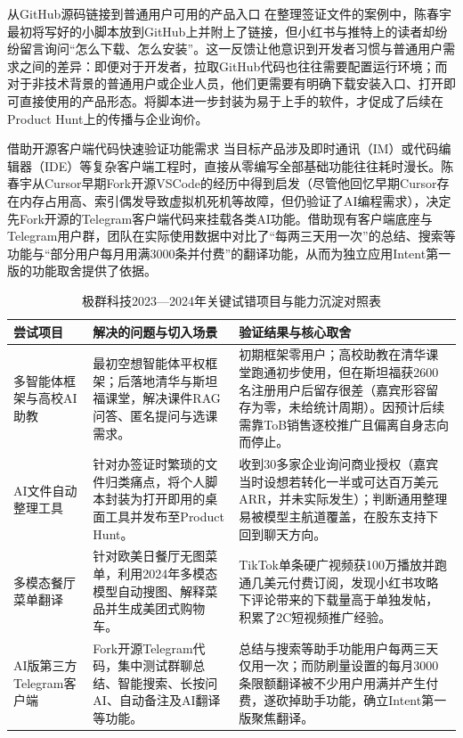 \documentclass[UTF8,a4paper,11pt,fontset=fandol]{ctexart}
\begin{document}
\begin{knowledgebox}{从GitHub源码链接到普通用户可用的产品入口}
在整理签证文件的案例中，陈春宇最初将写好的小脚本放到GitHub上并附上了链接，但小红书与推特上的读者却纷纷留言询问“怎么下载、怎么安装”。这一反馈让他意识到开发者习惯与普通用户需求之间的差异：即便对于开发者，拉取GitHub代码也往往需要配置运行环境；而对于非技术背景的普通用户或企业人员，他们更需要有明确下载安装入口、打开即可直接使用的产品形态。将脚本进一步封装为易于上手的软件，才促成了后续在Product Hunt上的传播与企业询价。
\end{knowledgebox}
\begin{importantbox}{借助开源客户端代码快速验证功能需求}
当目标产品涉及即时通讯（IM）或代码编辑器（IDE）等复杂客户端工程时，直接从零编写全部基础功能往往耗时漫长。陈春宇从Cursor早期Fork开源VSCode的经历中得到启发（尽管他回忆早期Cursor存在内存占用高、索引偶发导致虚拟机死机等故障，但仍验证了AI编程需求），决定先Fork开源的Telegram客户端代码来挂载各类AI功能。借助现有客户端底座与Telegram用户群，团队在实际使用数据中对比了“每两三天用一次”的总结、搜索等功能与“部分用户每月用满3000条并付费”的翻译功能，从而为独立应用Intent第一版的功能取舍提供了依据。
\end{importantbox}
\begin{table}[H]\centering\small
\caption{极群科技2023—2024年关键试错项目与能力沉淀对照表}
\begin{tabular}{>{\raggedright\arraybackslash}p{\dimexpr(\linewidth-6\tabcolsep)/3\relax}>{\raggedright\arraybackslash}p{\dimexpr(\linewidth-6\tabcolsep)/3\relax}>{\raggedright\arraybackslash}p{\dimexpr(\linewidth-6\tabcolsep)/3\relax}}
\toprule
尝试项目 & 解决的问题与切入场景 & 验证结果与核心取舍\\\midrule
多智能体框架与高校AI助教 & 最初空想智能体平权框架；后落地清华与斯坦福课堂，解决课件RAG问答、匿名提问与选课需求。 & 初期框架零用户；高校助教在清华课堂跑通初步使用，但在斯坦福获2600名注册用户后留存很差（嘉宾形容留存为零，未给统计周期）。因预计后续需靠ToB销售逐校推广且偏离自身志向而停止。\\[4pt]
AI文件自动整理工具 & 针对办签证时繁琐的文件归类痛点，将个人脚本封装为打开即用的桌面工具并发布至Product Hunt。 & 收到30多家企业询问商业授权（嘉宾当时设想若转化一半或可达百万美元ARR，并未实际发生）；判断通用整理易被模型主航道覆盖，在股东支持下回到聊天方向。\\[4pt]
多模态餐厅菜单翻译 & 针对欧美日餐厅无图菜单，利用2024年多模态模型自动搜图、解释菜品并生成美团式购物车。 & TikTok单条硬广视频获100万播放并跑通几美元付费订阅，发现小红书攻略下评论带来的下载量高于单独发帖，积累了2C短视频推广经验。\\[4pt]
AI版第三方Telegram客户端 & Fork开源Telegram代码，集中测试群聊总结、智能搜索、长按问AI、自动备注及AI翻译等功能。 & 总结与搜索等助手功能用户每两三天仅用一次；而防刷量设置的每月3000条限额翻译被不少用户用满并产生付费，遂砍掉助手功能，确立Intent第一版聚焦翻译。\\[4pt]
\bottomrule\end{tabular}\end{table}
\end{document}
